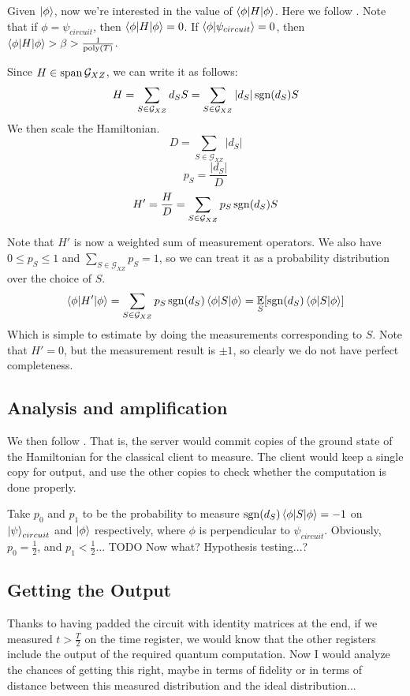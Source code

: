 Given $\ket\phi$, now we're interested in the value of $\braket{\phi|H|\phi}$. Here we follow \cite{PhysRevA.93.022326}. Note that if $\phi=\psi_{circuit}$, then $\braket{\phi|H|\phi}=0$. If $\braket{\phi|\psi_{circuit}}=0$, then $\braket{\phi|H|\phi}>\beta>\frac{1}{\operatorname*{\operatorname{poly}}(T)}$.

Since $H\in\operatorname*{\operatorname{span}}\mathcal{G}_{XZ}$, we can write it as follows:
$$H=\sum_{S\in\mathcal{G}_{XZ}} d_S S= \sum_{S\in\mathcal{G}_{XZ}} |d_S|\operatorname{sgn}(d_S)S$$
We then scale the Hamiltonian.
$$D=\sum_{S\in\mathcal{G}_{XZ}}|d_S|$$
$$p_S=\frac{|d_S|}{D}$$
$$H'=\frac{H}{D}=\sum_{S\in\mathcal{G}_{XZ}} p_S\operatorname{sgn}(d_S)S$$

Note that $H'$ is now a weighted sum of measurement operators. We also have $0\leq p_S\leq1$ and $\sum_{S\in\mathcal{G}_{XZ}} p_S=1$, so we can treat it as a probability distribution over the choice of $S$.
$$\braket{\phi|H'|\phi}=\sum_{S\in\mathcal{G}_{XZ}} p_S\operatorname{sgn}(d_S)\braket{\phi|S|\phi}=\operatorname*{\mathbb{E}}_S[\operatorname{sgn}(d_S)\braket{\phi|S|\phi}]$$
Which is simple to estimate by doing the measurements corresponding to $S$.
Note that $H'=0$, but the measurement result is $\pm1$, so clearly we do not have perfect completeness.

\subsection{Analysis and amplification}

We then follow \cite{mahadev_delegation}. That is, the server would commit copies of the ground state of the Hamiltonian for the classical client to measure.
The client would keep a single copy for output, and use the other copies to check whether the computation is done properly.

Take $p_0$ and $p_1$ to be the probability to measure $\operatorname{sgn}(d_S)\braket{\phi|S|\phi}=-1$ on $\ket\psi_{circuit}$ and $\ket\phi$ respectively, where $\phi$ is perpendicular to $\psi_{circuit}$. Obviously, $p_0=\frac{1}{2}$, and $p_1<\frac{1}{2}$... TODO Now what? Hypothesis testing...?

\subsection{Getting the Output}

Thanks to having padded the circuit with identity matrices at the end, if we measured $t>\frac{T}{2}$ on the time register, we would know that the other registers include the output of the required quantum computation. Now I would analyze the chances of getting this right, maybe in terms of fidelity or in terms of distance between this measured distribution and the ideal distribution...
